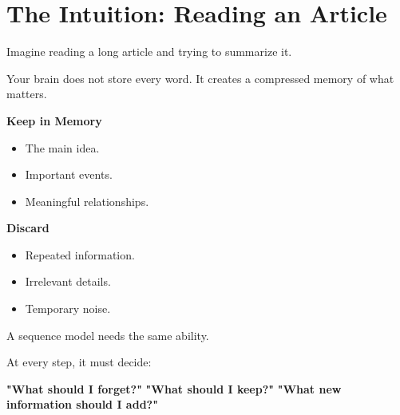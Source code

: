 \documentclass[11pt]{article}
\begin{document}
    \section*{The Intuition: Reading an Article}
    
    \vspace{0.15in}
    
    Imagine reading a long article and trying to summarize it.
    
    Your brain does not store every word. It creates a compressed memory of what matters.
    
    \vspace{0.2in}
    
    \begin{minipage}[t]{0.45\textwidth}
        {\large\color{brandnavy}\textbf{Keep in Memory}}
    
        \begin{itemize}[leftmargin=*, itemsep=0.1in, label={\color{brandblue}\textbullet}]
            \item The main idea.
            \item Important events.
            \item Meaningful relationships.
        \end{itemize}
    
    \end{minipage}
    \hfill
    \begin{minipage}[t]{0.45\textwidth}
    
        {\large\color{brandgray}\textbf{Discard}}
    
        \begin{itemize}[leftmargin=*, itemsep=0.1in, label={\color{brandorange}\textbullet}]
            \item Repeated information.
            \item Irrelevant details.
            \item Temporary noise.
        \end{itemize}
    
    \end{minipage}
    
    \vspace{0.3in}
    
    \begin{infobox}
    
    A sequence model needs the same ability.
    
    At every step, it must decide:
    
    \vspace{0.1in}
    
    \begin{center}
    \textbf{"What should I forget?"} \quad
    \textbf{"What should I keep?"} \quad
    \textbf{"What new information should I add?"}
    \end{center}
    
    \end{infobox}
    
\end{document}
